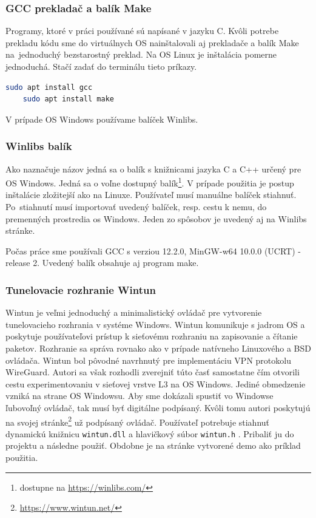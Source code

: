 \subsubsection{GCC prekladač a balík Make \cite{gcc}}
Programy, ktoré v práci používané sú napísané v jazyku C. Kvôli potrebe prekladu kódu sme do virtuálnych OS nainštalovali aj prekladače a balík Make na~jednoduchý bezstarostný preklad.
Na OS Linux je inštalácia pomerne jednoduchá. Stačí zadať do terminálu tieto príkazy.
\begin{lstlisting}[language=bash]
	sudo apt install gcc
	sudo apt install make
\end{lstlisting}  
V prípade OS Windows používame balíček Winlibs. 

\subsubsection{Winlibs balík \cite{winlibs}}
Ako naznačuje názov jedná sa o balík s knižnicami jazyka C a C++ určený pre OS Windows. Jedná sa o voľne dostupný balík\footnote{dostupne na \href{https://winlibs.com/}{https://winlibs.com/}}. V prípade použitia je postup inštalácie zložitejší ako na Linuxe. Používateľ musí manuálne balíček stiahnuť. Po~stiahnutí musí importovať uvedený balíček, resp. cestu k nemu, do premenných prostredia \acrshort{os} Windows. Jeden zo spôsobov je uvedený aj na Winlibs stránke. 

Počas práce sme používali GCC s verziou 12.2.0, MinGW-w64 10.0.0 (UCRT) - release 2. Uvedený balík obsahuje aj program make.  
\subsubsection{Tunelovacie rozhranie Wintun \cite{wintun}}
Wintun je veľmi jednoduchý a minimalistický ovládač pre vytvorenie tunelovacieho rozhrania v systéme Windows. Wintun komunikuje s jadrom OS a poskytuje používateľovi prístup k sieťovému rozhraniu na zapisovanie a čítanie paketov. Rozhranie sa správa rovnako ako v prípade natívneho Linuxového a BSD ovládača. Wintun bol pôvodné navrhnutý pre implementáciu VPN protokolu WireGuard. Autori sa však rozhodli zverejniť túto časť samostatne čím otvorili cestu experimentovaniu v sieťovej vrstve L3 na OS Windows. Jediné obmedzenie vzniká na strane OS Windowsu. Aby sme dokázali spustiť vo Windowse ľubovoľný ovládač, tak musí byť digitálne podpísaný. Kvôli tomu autori poskytujú na svojej stránke\footnote{\url{https://www.wintun.net/}} už podpísaný ovládač. Používateľ potrebuje stiahnuť dynamickú knižnicu \lstinline|wintun.dll| a hlavičkový súbor \lstinline|wintun.h| . Pribaliť ju do projektu a následne použiť. Obdobne je na stránke vytvorené demo ako príklad použitia. 

